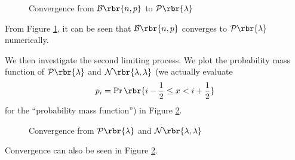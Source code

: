 \documentclass[english, nochinese]{pnote}
\DeclareMathOperator\oppr{\mathrm{Pr}}
\begin{document}
\begin{figure}[htb]
\centering
\scalebox{0.7}{}
\caption{Convergence from $ \mathcal{B} \rbr{ n, p } $ to $ \mathcal{P} \rbr{\lambda} $}
\label{Fig:BinomPoi}
\end{figure}

From Figure \ref{Fig:BinomPoi}, it can be seen that $ \mathcal{B} \rbr{ n, p } $ converges to $ \mathcal{P} \rbr{\lambda} $ numerically.

We then investigate the second limiting process. We plot the probability mass function of $ \mathcal{P} \rbr{\lambda} $ and $ \mathcal{N} \rbr{ \lambda, \lambda } $ (we actually evaluate
\begin{equation}
p_i = \oppr \rbr{ i - \frac{1}{2} \le x < i + \frac{1}{2} }
\end{equation}
for the ``probability mass function'') in Figure \ref{Fig:PoiNorm}.

\begin{figure}[htb]
\centering
\scalebox{0.7}{}
\caption{Convergence from $ \mathcal{P} \rbr{\lambda} $ and $ \mathcal{N} \rbr{ \lambda, \lambda } $}
\label{Fig:PoiNorm}
\end{figure}

Convergence can also be seen in Figure \ref{Fig:PoiNorm}.
\end{document}
